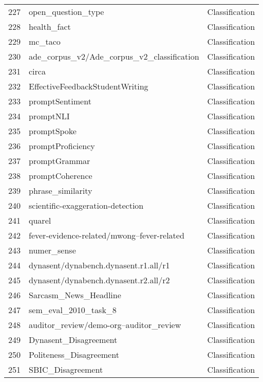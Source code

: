 \documentclass[11pt]{article}
\begin{document}
\begin{longtable}{lll}
227 & open\_question\_type \citep{cao-wang-2021-controllable} & Classification \\
228 & health\_fact \citep{kotonya-toni-2020-explainable} & Classification \\
229 & mc\_taco \citep{ZKNR19} & Classification \\
230 & ade\_corpus\_v2/Ade\_corpus\_v2\_classification \citep{GURULINGAPPA2012885} & Classification \\
231 & circa \citep{louis_emnlp2020} & Classification \\
232 & EffectiveFeedbackStudentWriting & Classification \\
233 & promptSentiment \citep{mcauley2013hidden} & Classification \\
234 & promptNLI \citep{nie2019adversarial} & Classification \\
235 & promptSpoke & Classification \\
236 & promptProficiency & Classification \\
237 & promptGrammar \citep{warstadt2018neural} & Classification \\
238 & promptCoherence & Classification \\
239 & phrase\_similarity \citep{pham2022PiC} & Classification \\
240 & scientific-exaggeration-detection \citep{wright2021exaggeration} & Classification \\
241 & quarel & Classification \\
242 & fever-evidence-related/mwong--fever-related & Classification \\
243 & numer\_sense \citep{lin2020numersense} & Classification \\
244 & dynasent/dynabench.dynasent.r1.all/r1 \citep{potts-etal-2020-dynasent} & Classification \\
245 & dynasent/dynabench.dynasent.r2.all/r2 \citep{potts-etal-2020-dynasent} & Classification \\
246 & Sarcasm\_News\_Headline & Classification \\
247 & sem\_eval\_2010\_task\_8 \citep{hendrickx-etal-2010-semeval} & Classification \\
248 & auditor\_review/demo-org--auditor\_review & Classification \\
249 & Dynasent\_Disagreement & Classification \\
250 & Politeness\_Disagreement & Classification \\
251 & SBIC\_Disagreement & Classification \\

\end{longtable}
\end{document}

